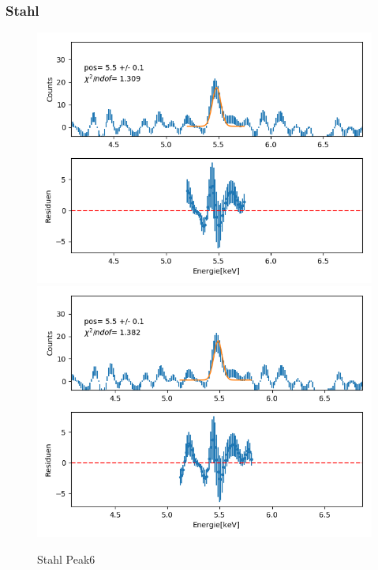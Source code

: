 \documentclass[12pt,a4paper]{article}
\begin{document}
\subsubsection{Stahl}
\begin{figure}[H]
\centering
\includegraphics[scale=0.49]{Bilder/alpha_spektren/stahl_1_1.png}
\includegraphics[scale=0.49]{Bilder/alpha_spektren/stahl_1_2.png}
\caption{Stahl Peak6}
\end{figure}
\end{document}
